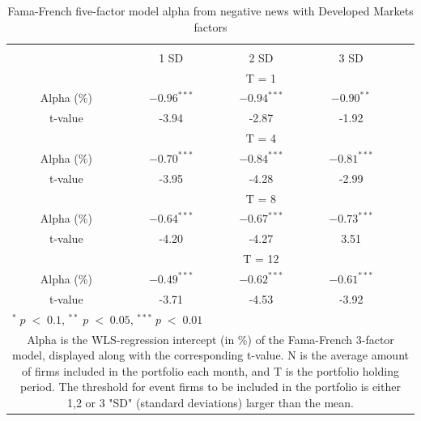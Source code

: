 \setlength{\tabcolsep}{15pt}
\begin{table}[]
\small
\centering
\caption{Fama-French five-factor model alpha from negative news with Developed Markets factors} 
\begin{tabular}{ccccccc}
\hline \hline \\ 
 &     &  &    1 SD  &  2 SD  &  3 SD  &  \\ \cline{4-6} 
& & & \multicolumn{3}{c}{ T = 1} & \\ \cline{2-6}
& Alpha (\%)  &  & $-0.96^{***}$  & $-0.94^{***}$  & $-0.90^{**}$ &  \\
& t-value &  & -3.94 & -2.87  & -1.92 & \\
& & & \multicolumn{3}{c}{ T = 4} & \\ \cline{2-6}
& Alpha (\%)  &  & $-0.70^{***}$  & $-0.84^{***}$  &  $-0.81^{***}$ & \\
& t-value & & -3.95 & -4.28 & -2.99 & \\
& & & \multicolumn{3}{c}{ T = 8} & \\ \cline{2-6}
& Alpha (\%)  &  & $-0.64^{***}$   & $-0.67^{***}$  & $-0.73^{***}$ &  \\
& t-value &  & -4.20  & -4.27 & 3.51 & \\
&  & & \multicolumn{3}{c}{ T = 12} & \\ \cline{2-6}
& Alpha (\%)  &  & $-0.49^{***}$  & $-0.62^{***}$  & $-0.61^{***}$ &  \\
& t-value &  & -3.71  & -4.53 & -3.92 & \\
\hline \hline
 \multicolumn{7}{l}{ \footnotesize $^* \; p\; <\; 0.1$, $ ^{**} \; p\; <\; 0.05$, $ ^{***} \; p\; <\; 0.01$  } \\
 \multicolumn{7}{p{11.5cm}}{ \footnotesize Alpha is the WLS-regression intercept (in \%) of the Fama-French 3-factor model, displayed along with the corresponding t-value. N is the average amount of firms included in the portfolio each month, and T is the portfolio holding period. The threshold for event firms to be included in the portfolio is either 1,2 or 3 "SD" (standard deviations) larger than the mean.}  \\ 
\end{tabular}
\label{tab: FF3-pos}
\end{table}





